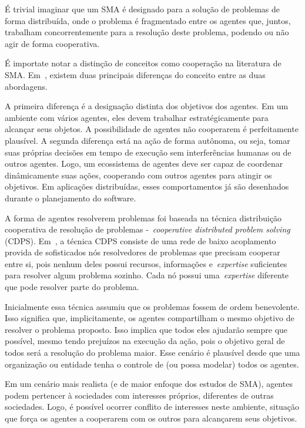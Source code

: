 É trivial imaginar que um SMA é designado para a solução de problemas de forma distribuída, onde o problema é fragmentado entre os agentes que, juntos, trabalham concorrentemente para a resolução deste problema, podendo ou não agir de forma cooperativa.

É importate notar a distinção de conceitos como cooperação na literatura de SMA. Em~\cite{wooldridge04}, existem duas principais diferenças do conceito entre as duas abordagens.

A primeira diferença é a designação distinta dos objetivos dos agentes. Em um ambiente com vários agentes, eles devem trabalhar estratégicamente para alcançar seus objetos. A possibilidade de agentes não cooperarem é perfeitamente plausível. A segunda diferença está na ação de forma autônoma, ou seja, tomar suas próprias decisões em tempo de execução sem interferências humanas ou de outros agentes. Logo, um ecossistema de agentes deve ser capaz de coordenar dinâmicamente suas ações, cooperando com outros agentes para atingir os objetivos. Em aplicações distribuídas, esses comportamentos já são desenhados durante o planejamento do software.

A forma de agentes resolverem problemas foi baseada na técnica distribuição cooperativa de resolução de problemas -~\emph{cooperative distributed problem solving} (CDPS). Em~\cite{durfee89}, a técnica CDPS consiste de uma rede de baixo acoplamento provida de sofisticados nós resolvedores de problemas que precisam cooperar entre si, pois nenhum deles possui recursos, informações e~\emph{expertise} suficientes para resolver algum problema sozinho. Cada nó possui uma~\emph{expertise} diferente que pode resolver parte do problema.

Inicialmente essa técnica assumiu que os problemas fossem de ordem benevolente. Isso significa que, implicitamente, os agentes compartilham o mesmo objetivo de resolver o problema proposto. Isso implica que todos eles ajudarão sempre que possível, mesmo tendo prejuízos na execução da ação, pois o objetivo geral de todos será a resolução do problema maior. Esse cenário é plausível desde que uma organização ou entidade tenha o controle de (ou possa modelar) todos os agentes.

Em um cenário mais realista (e de maior enfoque dos estudos de SMA), agentes podem pertencer à sociedades com interesses próprios, diferentes de outras sociedades. Logo, é possível ocorrer conflito de interesses neste ambiente, situação que força os agentes a cooperarem com os outros para alcançarem seus objetivos.

